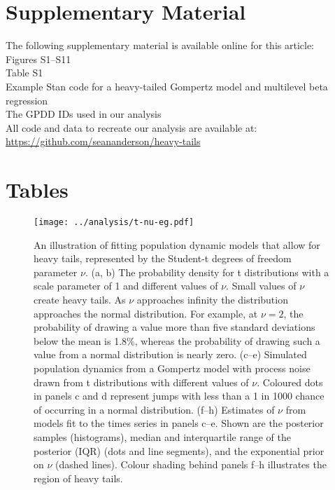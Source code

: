 \section{Supplementary Material}

The following supplementary material is available online for this article:\\
Figures S1--S11\\
Table S1\\
Example Stan code for a heavy-tailed Gompertz model and multilevel beta
regression\\
The GPDD IDs used in our analysis\\
All code and data to recreate our analysis are available at:\\
\url{https://github.com/seananderson/heavy-tails}




\clearpage

\section{Tables}



\begin{figure}[htbp]
\begin{center}
\texttt{[image: ../analysis/t-nu-eg.pdf]}
\caption{
An illustration of fitting population dynamic models that allow for heavy
tails, represented by the Student-t degrees of freedom parameter $\nu$. (a, b)
The probability density for t distributions with a scale parameter of 1 and
different values of $\nu$. Small values of $\nu$ create heavy tails. As $\nu$
approaches infinity the distribution approaches the normal distribution. For
example, at $\nu = 2$, the probability of drawing a value more than five
standard deviations below the mean is
1.8\%, whereas the probability of drawing such a value from a normal
distribution is nearly zero. (c--e) Simulated population dynamics from
a Gompertz model with process noise drawn from t distributions with different
values of $\nu$. Coloured dots in panels c and d represent jumps with less than
a 1 in 1000 chance of occurring in a normal distribution. (f--h) Estimates of
$\nu$ from models fit to the times series in panels c--e. Shown are the
posterior samples (histograms), median and interquartile range of the posterior
(IQR) (dots and line segments), and the exponential prior on $\nu$ (dashed
lines). Colour shading behind panels f--h illustrates the region of heavy
tails.}
\label{fig:didactic}
\end{center}
\end{figure}

